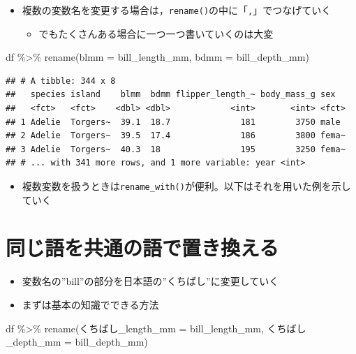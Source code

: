 \documentclass[
  xelatex,ja=standard, b5paper]{bxjsbook}
\newenvironment{Shaded}{\begin{snugshade}}{\end{snugshade}}
\newcommand{\AttributeTok}[1]{\textcolor[rgb]{0.77,0.63,0.00}{#1}}
\newcommand{\FunctionTok}[1]{\textcolor[rgb]{0.00,0.00,0.00}{#1}}
\newcommand{\NormalTok}[1]{#1}
\newcommand{\SpecialCharTok}[1]{\textcolor[rgb]{0.00,0.00,0.00}{#1}}
\providecommand{\tightlist}{%
  \setlength{\itemsep}{0pt}\setlength{\parskip}{0pt}}
\begin{document}
\begin{itemize}
\tightlist
\item
  複数の変数名を変更する場合は，\texttt{rename()}の中に「\texttt{,}」でつなげていく

  \begin{itemize}
  \tightlist
  \item
    でもたくさんある場合に一つ一つ書いていくのは大変
  \end{itemize}
\end{itemize}

\begin{Shaded}
\begin{Highlighting}[]
\NormalTok{df }\SpecialCharTok{\%\textgreater{}\%} 
  \FunctionTok{rename}\NormalTok{(}\AttributeTok{blmm =}\NormalTok{ bill\_length\_mm,}
         \AttributeTok{bdmm =}\NormalTok{ bill\_depth\_mm)}
\end{Highlighting}
\end{Shaded}

\begin{verbatim}
## # A tibble: 344 x 8
##   species island    blmm  bdmm flipper_length_~ body_mass_g sex  
##   <fct>   <fct>    <dbl> <dbl>            <int>       <int> <fct>
## 1 Adelie  Torgers~  39.1  18.7              181        3750 male 
## 2 Adelie  Torgers~  39.5  17.4              186        3800 fema~
## 3 Adelie  Torgers~  40.3  18                195        3250 fema~
## # ... with 341 more rows, and 1 more variable: year <int>
\end{verbatim}

\begin{itemize}
\tightlist
\item
  複数変数を扱うときは\texttt{rename\_with()}が便利。以下はそれを用いた例を示していく
\end{itemize}

\hypertarget{rename-samew}{%
\section{同じ語を共通の語で置き換える}\label{rename-samew}}

\begin{itemize}
\tightlist
\item
  変数名の''bill''の部分を日本語の''くちばし''に変更していく
\item
  まずは基本の知識でできる方法
\end{itemize}

\begin{Shaded}
\begin{Highlighting}[]
\NormalTok{df }\SpecialCharTok{\%\textgreater{}\%} 
  \FunctionTok{rename}\NormalTok{(くちばし}\AttributeTok{\_length\_mm =}\NormalTok{ bill\_length\_mm,}
\NormalTok{         くちばし}\AttributeTok{\_depth\_mm =}\NormalTok{ bill\_depth\_mm)}
\end{Highlighting}
\end{Shaded}
\end{document}
